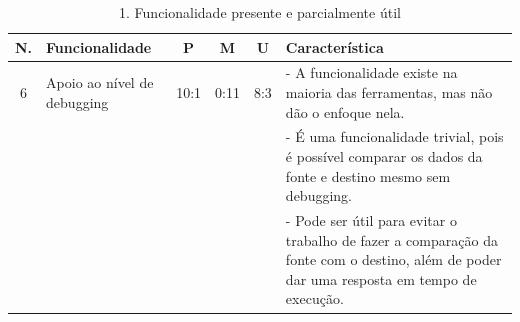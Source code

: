 \begin{table}[h]
	\centering
	\caption{1. Funcionalidade presente e parcialmente útil}
	\label{grupo1}
	\begin{tabular}{|c|p{4cm}|c|c|c|p{7cm}|}
		\hline
		N. & Funcionalidade & P & M & U & Característica  \\
		\hline
		6 & Apoio ao nível de debugging & 10:1 & 0:11 & 8:3 & - A funcionalidade existe na maioria das ferramentas, mas não dão o enfoque nela. \\
		&&&&& - É uma funcionalidade trivial, pois é possível comparar os dados da fonte e destino mesmo sem debugging.\\
		&&&&& - Pode ser útil para evitar o trabalho de fazer a comparação da fonte com o destino, além de poder dar uma resposta em tempo de execução.\\
		\hline
		
		
	\end{tabular}
\end{table}


